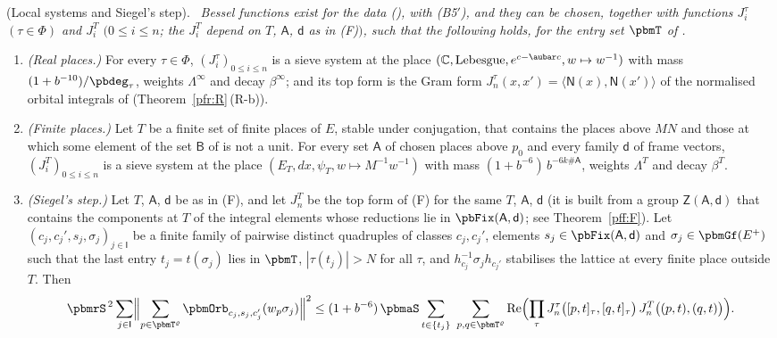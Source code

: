 \documentclass[10pt]{amsart}
\theoremstyle{definition}
\theoremstyle{remark}
\newcommand{\C}{\mathbb C}
\newcommand{\Rel}{\operatorname{Re}}
\providecommand{\auPl}{\Phi}
\newenvironment{quotedthm}[2]{\par\medskip\noindent\begingroup
  \textbf{#1}#2.\ \itshape\ignorespaces}{\endgroup\par\medskip}
\begin{document}
\begin{quotedthm}{\cite[Theorem~3.51]{P51}}{ (Local systems and Siegel's step)}
Bessel functions exist for the data ({\cite[Definition~2.16]{P51}}), with \textup{(B5$'$)}, and they
can be chosen, together with functions $J^\tau_i$ $(\tau\in\auPl)$ and $J^T_i$ $(0\le i\le n$; the
$J^T_i$ depend on $T$, $\mathsf A$, $\mathsf d$ as in \textup{(F)}$)$, such that the following
holds, for the entry set $\pbmT$ of {\cite[\S3.3.2]{P51}}.
\begin{enumerate}
\item[(R)] \emph{(Real places.)} For every $\tau\in\auPl$, $(J^\tau_i)_{0\le i
\le n}$ is a sieve system at the place $(\C,\text{Lebesgue},e^{c-\aubar c},w\mapsto w^{-1})$ with mass $(1+b^{-10})/
\pbdeg_\tau$, weights $\Lambda^\infty$ and decay $\beta^\infty$; and its top form is the Gram form
$J^\tau_n(x,x')=\langle\mathsf N(x),\mathsf N(x')\rangle$ of the normalised orbital integrals of
{\cite[\S3.3.7]{P51}} (Theorem~\ref{pfr:R}\,(R-b)).
\item[(F)] \emph{(Finite places.)} Let $T$ be a finite set of finite places of $E$, stable under
conjugation, that contains the places above $MN$ and those at which some element of the set
$\mathsf B$ of {\cite[\S3.3.2]{P51}} is not a unit. For every set $\mathsf A$ of chosen places above
$p_0$ and every family $\mathsf d$ of frame vectors, $(J^{T}_i)_{0\le i\le
n}$ is a sieve system at the place $(E_T,dx,\psi_T,w\mapsto M^{-1}w^{-1})$ with mass $(1+b^{-6})\,b^{-6k\#\mathsf A}$,
weights $\Lambda^T$ and decay $\beta^T$.
\item[(S)] \emph{(Siegel's step.)} Let $T$, $\mathsf A$, $\mathsf d$ be as in \textup{(F)}, and let $J^T_n$
be the top form of \textup{(F)} for the same $T$, $\mathsf A$, $\mathsf d$ (it is built from a group
$\mathsf Z(\mathsf A,\mathsf d)$ that contains the components at $T$ of the integral elements whose
reductions lie in $\pbFix(\mathsf A,\mathsf d)$; see Theorem~\ref{pff:F}). Let
$(c_j,c_j',s_j,\sigma_j)_{j\in\mathsf I}$ be a finite family of pairwise distinct quadruples of
classes $c_j,c_j'$, elements $s_j\in\pbFix(\mathsf A,\mathsf d)$ and $\sigma_j\in\pbmGf(E^+)$ such
that the last entry $t_j=t(\sigma_j)$ lies in $\pbmT$, $|\tau(t_j)|>N$ for all $\tau$, and
$h_{c_j}^{-1}\sigma_jh_{c_j'}$ stabilises the lattice at every finite place outside $T$. Then
\[
\pbmrS^{\,2}\sum_{j\in\mathsf I}\Bigl\|\sum_{p\in\pbmT^\varrho}\pbmOrb_{c_j,s_j,c_j'}(w_p\sigma_j)\Bigr\|^2\le
(1+b^{-6})\,\pbmaS\sum_{t\in\{t_j\}}\ \sum_{p,q\in\pbmT^\varrho}\Rel\Bigl(\prod_\tau J^\tau_n\bigl([p,t]_\tau,
[q,t]_\tau\bigr)\,J^T_n\bigl((p,t),(q,t)\bigr)\Bigr).
\]
\end{enumerate}
\end{quotedthm}
\end{document}
